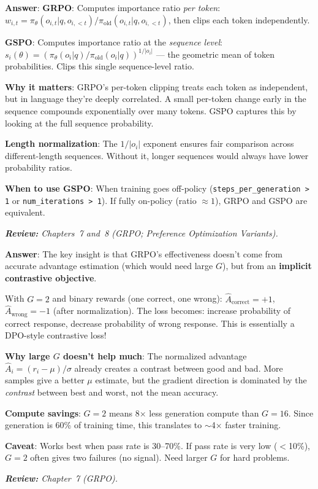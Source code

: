 \begin{questionbox}
\textbf{Answer}: \textbf{GRPO}: Computes importance ratio \emph{per token}: $w_{i,t} = \pi_\theta(o_{i,t}|q, o_{i,<t}) / \pi_\text{old}(o_{i,t}|q, o_{i,<t})$, then clips each token independently.

\textbf{GSPO}: Computes importance ratio at the \emph{sequence level}: $s_i(\theta) = (\pi_\theta(o_i|q)/\pi_\text{old}(o_i|q))^{1/|o_i|}$ --- the geometric mean of token probabilities. Clips this single sequence-level ratio.

\textbf{Why it matters}: GRPO’s per-token clipping treats each token as independent, but in language they’re deeply correlated. A small per-token change early in the sequence compounds exponentially over many tokens. GSPO captures this by looking at the full sequence probability.

\textbf{Length normalization}: The $1/|o_i|$ exponent ensures fair comparison across different-length sequences. Without it, longer sequences would always have lower probability ratios.

\textbf{When to use GSPO}: When training goes off-policy (\texttt{steps\_per\_generation > 1} or \texttt{num\_iterations > 1}). If fully on-policy (ratio $\approx 1$), GRPO and GSPO are equivalent.

\emph{\textbf{Review:} Chapters~7 and~8 (GRPO; Preference Optimization Variants).}
\end{questionbox}

\begin{questionbox}[Q24: The paper ``It Takes Two'' shows G=2 matches G=16. How is that possible?]
\textbf{Answer}: The key insight is that GRPO’s effectiveness doesn’t come from accurate advantage estimation (which would need large $G$), but from an \textbf{implicit contrastive objective}.

With $G=2$ and binary rewards (one correct, one wrong): $\hat{A}_\text{correct} = +1$, $\hat{A}_\text{wrong} = -1$ (after normalization). The loss becomes: increase probability of correct response, decrease probability of wrong response. This is essentially a DPO-style contrastive loss!

\textbf{Why large $G$ doesn’t help much}: The normalized advantage $\hat{A}_i = (r_i - \mu)/\sigma$ already creates a contrast between good and bad. More samples give a better $\mu$ estimate, but the gradient direction is dominated by the \emph{contrast} between best and worst, not the mean accuracy.

\textbf{Compute savings}: $G=2$ means 8$\times$ less generation compute than $G=16$. Since generation is 60\% of training time, this translates to $\sim$4$\times$ faster training.

\textbf{Caveat}: Works best when pass rate is 30--70\%. If pass rate is very low ($<$10\%), $G=2$ often gives two failures (no signal). Need larger $G$ for hard problems.

\emph{\textbf{Review:} Chapter~7 (GRPO).}
\end{questionbox}

